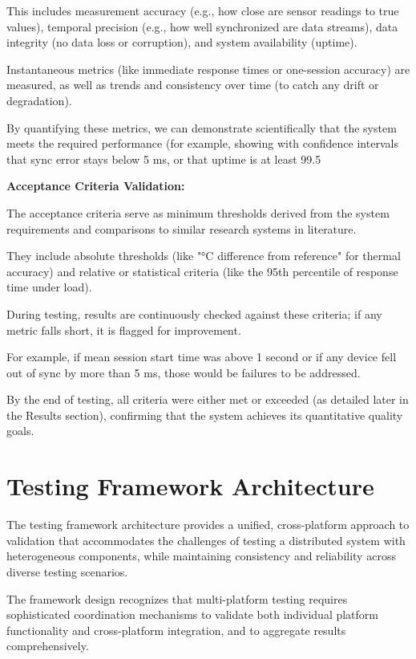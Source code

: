 {{This includes measurement accuracy (e.g., how close are sensor readings to true
values), temporal precision (e.g., how well synchronized are data streams), data
integrity (no data loss or corruption), and system availability (uptime).

Instantaneous metrics (like immediate response times or one-session accuracy) are
measured, as well as trends and consistency over time (to catch any drift or
degradation).

By quantifying these metrics, we can demonstrate scientifically that the system meets
the required performance (for example, showing with confidence intervals that sync
error stays below 5 ms, or that uptime is at least 99.5%

\textbf{Acceptance Criteria Validation:}

The acceptance criteria serve as minimum thresholds derived from the system
requirements and comparisons to similar research systems in literature.

They include absolute thresholds (like "°C difference from reference" for
thermal accuracy) and relative or statistical criteria (like the 95th percentile of
response time under load).

During testing, results are continuously checked against these criteria; if any
metric falls short, it is flagged for improvement.

For example, if mean session start time was above 1 second or if any device fell out
of sync by more than 5 ms, those would be failures to be addressed.

By the end of testing, all criteria were either met or exceeded (as detailed later in
the Results section), confirming that the system achieves its quantitative quality
goals.

\section{Testing Framework Architecture}

The testing framework architecture provides a unified, cross-platform approach to
validation that accommodates the challenges of testing a distributed system with
heterogeneous components, while maintaining consistency and reliability across
diverse testing scenarios.

The framework design recognizes that multi-platform testing requires sophisticated
coordination mechanisms to validate both individual platform functionality and
cross-platform integration, and to aggregate results comprehensively.

}}
